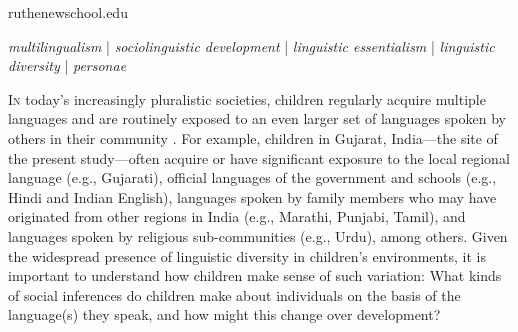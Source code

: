 \documentclass[9pt,twocolumn,twoside,lineno]{article}
\begin{document}
\begin{corrauthor}
ruthe\at newschool.edu
\end{corrauthor}
\begin{keywords}
\noindent
\textit{multilingualism} | \textit{sociolinguistic development} | \textit{linguistic essentialism} | \textit{ linguistic diversity} | \textit{personae}
\end{keywords}
\maketitle
\vspace{5pt}
\lettrine{I}n today's increasingly pluralistic societies, children regularly acquire multiple languages and are routinely exposed to an even larger set of languages spoken by others in their community \parencite{lin2020research, grosjean2010bilingual}. 
For example, children in Gujarat, India---the site of the present study---often acquire or have significant exposure to the local regional language (e.g., Gujarati), official languages of the government and schools (e.g., Hindi and Indian English), languages spoken by family members who may have originated from other regions in India (e.g., Marathi, Punjabi, Tamil), and languages spoken by religious sub-communities (e.g., Urdu), among others. Given the widespread presence of linguistic diversity in children's environments, it is important to understand how children make sense of such variation: What kinds of social inferences do children make about individuals on the basis of the language(s) they speak, and how might this change over development? %
\end{document}
